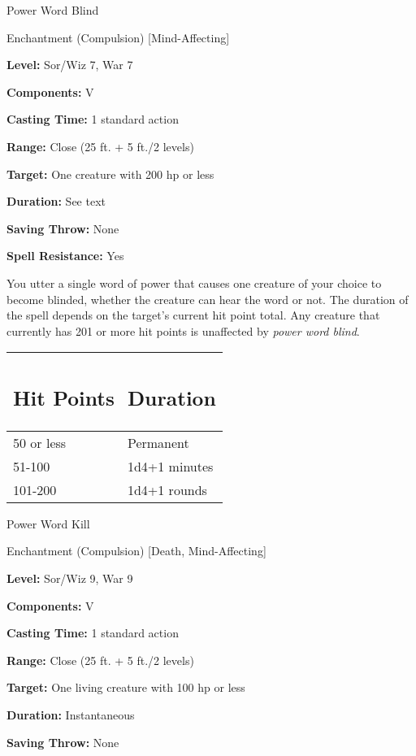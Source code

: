 \documentclass{article}
\begin{document}
\vspace{12pt}
Power Word Blind

Enchantment (Compulsion) [Mind-Affecting]

\textbf{Level:} Sor/Wiz 7, War 7

\textbf{Components:} V

\textbf{Casting Time:} 1 standard action

\textbf{Range:} Close (25 ft. + 5 ft./2 levels)

\textbf{Target:} One creature with 200 hp or less

\textbf{Duration:} See text

\textbf{Saving Throw:} None

\textbf{Spell Resistance:} Yes

You utter a single word of power that causes one creature of your choice to become 
blinded, whether the creature can hear the word or not. The duration of the spell 
depends on the target's current hit point total. Any creature that currently has 
201 or more hit points is unaffected by \textit{power word blind}.

\begin{tabular}{|>{\raggedright}p{41pt}|>{\raggedright}p{58pt}|}
\hline
\subsection*{H\textbf{it Points}} & \subsection*{D\textbf{uration}}\tabularnewline
\hline
50 or less & Permanent\tabularnewline
\hline
51-100 & 1d4+1 minutes\tabularnewline
\hline
101-200 & 1d4+1 rounds\tabularnewline
\hline
\end{tabular}

\vspace{12pt}
Power Word Kill

Enchantment (Compulsion) [Death, Mind-Affecting]

\textbf{Level:} Sor/Wiz 9, War 9

\textbf{Components:} V

\textbf{Casting Time:} 1 standard action

\textbf{Range:} Close (25 ft. + 5 ft./2 levels)

\textbf{Target:} One living creature with 100 hp or less

\textbf{Duration:} Instantaneous

\textbf{Saving Throw:} None
\end{document}

